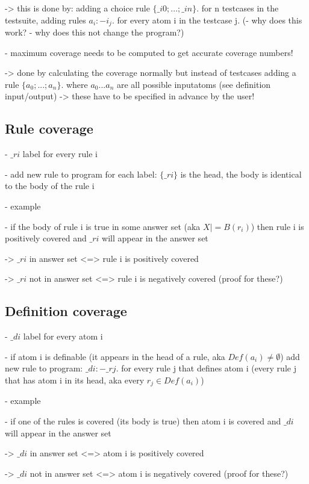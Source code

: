 -> this is done by: adding a choice rule $\{\_i0;...;\_in\}$. for n testcases in the testsuite, adding rules $a_i :- i_j$. for every atom i 
in the testcase j.
(- why does this work?
- why does this not change the program?)

- maximum coverage needs to be computed to get accurate coverage numbers!

-> done by calculating the coverage normally but instead of testcases adding a rule $\{a_0;...;a_n\}$. where $a_0...a_n$ are all possible 
inputatoms (see definition input/output) -> these have to be specified in advance by the user!

\subsection{Rule coverage}
\label{subsec:Computing coverage metrics for propositional programs/General approach/Rule coverage}
- $\_ri$ label for every rule i

- add new rule to program for each label: $\{\_ri\}$ is the head, the body is identical to the body of the rule i

- example

- if the body of rule i is true in some answer set (aka $X |= B(r_i)$) then rule i is positively covered and $\_ri$ will appear in the answer set 

-> $\_ri$ in answer set <=> rule i is positively covered

-> $\_ri$ not in answer set <=> rule i is negatively covered (proof for these?)

\subsection{Definition coverage}
\label{subsec:Computing coverage metrics for propositional programs/General approach/Definition coverage}
- $\_di$ label for every atom i

- if atom i is definable (it appears in the head of a rule, aka $Def(a_i)\neq\emptyset$) add new rule to program: $\_di :- \_rj$. for every rule j that defines atom i 
(every rule j that has atom i in its head, aka every $r_j \in Def(a_i)$)

- example

- if one of the rules is covered (its body is true) then atom i is covered and $\_di$ will appear in the answer set

-> $\_di$ in answer set <=> atom i is positively covered

-> $\_di$ not in answer set <=> atom i is negatively covered (proof for these?)

